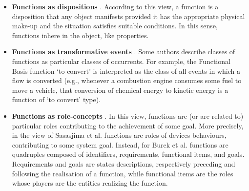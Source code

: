 \documentclass[
]{ceurart}
\begin{document}
\begin{itemize}
  \item \textbf{Functions as dispositions} \cite{arpFunctionRoleDisposition2008, barryBasicFormalOntology2015}. According to this view, a function is a disposition that any object manifests provided it has the appropriate physical make-up and the situation satisfies suitable conditions. In this sense, functions inhere in the object, like properties. 
  \item \textbf{Functions as transformative events} \cite{borgoFormalizationFunctionsOperations2011, garbaczTwoOntologydrivenFormalisations2011, garbaczStandardTaxonomyArtifact2005}. Some authors describe classes of functions as particular classes of occurrents. For example, the Functional Basis function `to convert' is interpreted as the class of all events in which a flow is converted (e.g., whenever a combustion engine consumes some fuel to move a vehicle, that conversion of chemical energy to kinetic energy is a function of `to convert' type).%
  \item \textbf{Functions as role-concepts} \cite{sasajimaFBRLFunctionBehavior1995,burekToplevelOntologyFunctions2006}. In this view, functions are (or are related to) particular roles contributing to the achievement of some goal. More precisely, in the view of Sasasjima et al. \cite{sasajimaFBRLFunctionBehavior1995} functions are roles of devices behaviours, contributing to some system goal. Instead, for Burek et al. \cite{burekToplevelOntologyFunctions2006} functions are quadruples composed of identifiers, requirements, functional items, and goals. Requirements and goals are states descriptions, respectively preceding and following the realisation of a function, while functional items are the roles whose players are the entities realizing the function. 
\end{itemize}
\end{document}
